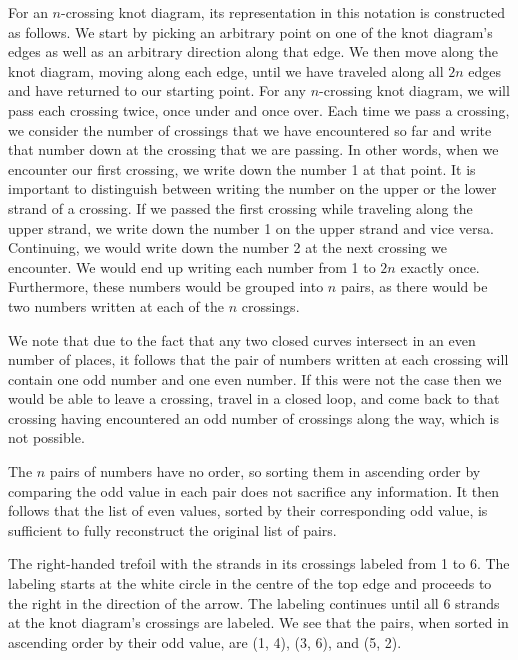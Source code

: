 \begin{paper}
For an $n$-crossing knot diagram, its representation in this notation is
constructed as follows.
We start by picking an arbitrary point on one of the knot diagram's edges as
well as an arbitrary direction along that edge.
We then move along the knot diagram, moving along each edge, until we have
traveled along all $2n$ edges and have returned to our starting point.
For any $n$-crossing knot diagram, we will pass each crossing twice, once under
and once over.
Each time we pass a crossing, we consider the number of crossings that we
have encountered so far and write that number down at the crossing that we are
passing.
In other words, when we encounter our first crossing, we write down the number 1
at that point.
It is important to distinguish between writing the number on the upper or the
lower strand of a crossing.
If we passed the first crossing while traveling along the upper strand, we write
down the number 1 on the upper strand and vice versa.
Continuing, we would write down the number 2 at the next crossing we encounter.
We would end up writing each number from 1 to $2n$ exactly once.
Furthermore, these numbers would be grouped into $n$ pairs, as there would be
two numbers written at each of the $n$ crossings.

We note that due to the fact that any two closed curves intersect in an even
number of places, it follows that the pair of numbers written at each crossing
will contain one odd number and one even number.
If this were not the case then we would be able to leave a crossing, travel in a
closed loop, and come back to that crossing having encountered an odd number of
crossings along the way, which is not possible.

The $n$ pairs of numbers have no order, so sorting them in ascending order by
comparing the odd value in each pair does not sacrifice any information.
It then follows that the list of even values, sorted by their corresponding odd
value, is sufficient to fully reconstruct the original list of pairs.\\

{\begin{center}\end{center}}
{The right-handed trefoil with the strands in its crossings labeled from 1 to 6.
The labeling starts at the white circle in the centre of the top edge and
proceeds to the right in the direction of the arrow.
The labeling continues until all 6 strands at the knot diagram's crossings are
labeled.
We see that the pairs, when sorted in ascending order by their odd value, are
(1, 4), (3, 6), and (5, 2).}


\end{paper}
